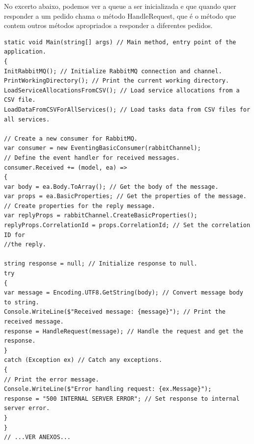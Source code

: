 \documentclass[12pt]{article}
\begin{document}
\noindent No excerto abaixo, podemos ver a queue a ser inicializada e que quando quer responder a um pedido chama o método HandleRequest, que é o método que contem outros métodos apropriados a responder a diferentes pedidos.
\begin{verbatim}
static void Main(string[] args) // Main method, entry point of the application.
{
InitRabbitMQ(); // Initialize RabbitMQ connection and channel.
PrintWorkingDirectory(); // Print the current working directory.
LoadServiceAllocationsFromCSV(); // Load service allocations from a CSV file.
LoadDataFromCSVForAllServices(); // Load tasks data from CSV files for all services.

// Create a new consumer for RabbitMQ.
var consumer = new EventingBasicConsumer(rabbitChannel); 
// Define the event handler for received messages.
consumer.Received += (model, ea) => 
{
var body = ea.Body.ToArray(); // Get the body of the message.
var props = ea.BasicProperties; // Get the properties of the message.
// Create properties for the reply message.
var replyProps = rabbitChannel.CreateBasicProperties(); 
replyProps.CorrelationId = props.CorrelationId; // Set the correlation ID for 
//the reply.

string response = null; // Initialize response to null.
try
{                
var message = Encoding.UTF8.GetString(body); // Convert message body to string.
Console.WriteLine($"Received message: {message}"); // Print the received message.
response = HandleRequest(message); // Handle the request and get the response.
}
catch (Exception ex) // Catch any exceptions.
{
// Print the error message.
Console.WriteLine($"Error handling request: {ex.Message}"); 
response = "500 INTERNAL SERVER ERROR"; // Set response to internal server error.
}
}
// ...VER ANEXOS...


\end{verbatim}
\end{document}
